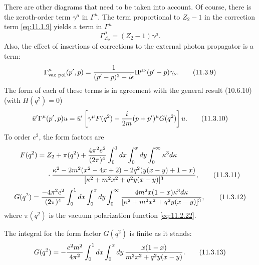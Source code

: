 There are other diagrams that need to be taken into account. Of course,
there is the zeroth-order term $\gamma^\mu$ in $\Gamma^\mu$. The term
proportional to $Z_2-1$ in the correction term \eqref{eq:11.1.9} yields a term in
$\Gamma^\mu$
\begin{equation}
\Gamma^\mu_{\mathcal L_2}=(Z_2-1)\gamma^\mu.
\tag{11.3.8}\label{eq:11.3.8}
\end{equation}
Also, the effect of insertions of corrections to the external photon
propagator is a term:
\begin{equation}
\Gamma^\mu_{\text{vac pol}}(p',p)=
 {1\over(p'-p)^2-i\epsilon}\Pi^{\mu\nu}(p'-p)\gamma_\nu.
\tag{11.3.9}\label{eq:11.3.9}
\end{equation}
The form of each of these terms is in agreement with the general result
(10.6.10) (with $H(q^2)=0$)
\begin{equation}
\bar u'\Gamma^\mu(p',p)u
=\bar u'\left[\gamma^\mu F(q^2)-{i\over2m}(p+p')^\mu G(q^2)\right]u.
\tag{11.3.10}\label{eq:11.3.10}
\end{equation}
To order $e^2$, the form factors are
\begin{align}
F(q^2)={}&Z_2+\pi(q^2)+{4\pi^2e^2\over(2\pi)^4}
 \int_0^1dx\int_0^xdy\int_0^\infty\kappa^3d\kappa\notag\\
&\cdot{\kappa^2-2m^2(x^2-4x+2)-2q^2(y(x-y)+1-x)
 \over[\kappa^2+m^2x^2+q^2y(x-y)]^3},
\tag{11.3.11}\label{eq:11.3.11}
\end{align}
\begin{equation}
G(q^2)={-4\pi^2e^2\over(2\pi)^4}
 \int_0^1dx\int_0^xdy\int_0^\infty
 {4m^2x(1-x)\kappa^3d\kappa
 \over[\kappa^2+m^2x^2+q^2y(x-y)]^3},
\tag{11.3.12}\label{eq:11.3.12}
\end{equation}
where $\pi(q^2)$ is the vacuum polarization function \eqref{eq:11.2.22}.

The integral for the form factor $G(q^2)$ is finite as it stands:
\begin{equation}
G(q^2)=-{e^2m^2\over4\pi^2}\int_0^1dx\int_0^xdy\,
 {x(1-x)\over m^2x^2+q^2y(x-y)}.
\tag{11.3.13}\label{eq:11.3.13}
\end{equation}

\suppressfloats[t]


